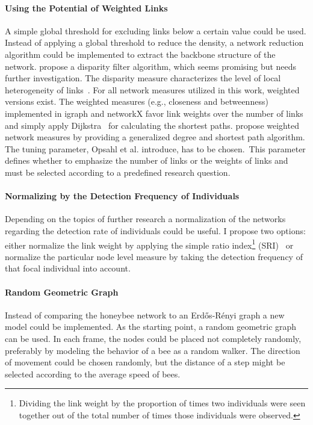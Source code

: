 \paragraph{Using the Potential of Weighted Links}
A simple global threshold for excluding links below a certain value could be used.
Instead of applying a global threshold to reduce the density, a network reduction algorithm could be implemented to extract the backbone structure of the network.
\textcite{serrano2009extracting} propose a disparity filter algorithm, which seems promising but needs further investigation.
The disparity measure characterizes the level of local heterogeneity of links~\cite{barthelemy2003spatial}.
For all network measures utilized in this work, weighted versions exist.
The weighted measures (e.g., closeness and betweenness) implemented in igraph and networkX favor link weights over the number of links and simply apply Dijkstra~\cite{dijkstra1959note} for calculating the shortest paths. \textcite{opsahl2010node} propose weighted network measures by providing a generalized degree and shortest path algorithm. The tuning parameter, Opsahl et al. introduce, has to be chosen.~This parameter defines whether to emphasize the number of links or the weights of links and must be selected according to a predefined research question.


\paragraph{Normalizing by the Detection Frequency of Individuals}
Depending on the topics of further research a normalization of the networks regarding the detection rate of individuals could be useful.
I propose two options: either normalize the link weight by applying the simple ratio index\footnote{Dividing the link weight by the proportion of times two individuals were seen together out of the total number of times those individuals were observed.} (SRI)~\cite{formica2012fitness} or normalize the particular node level measure by taking the detection frequency of that focal individual into account.

\paragraph{Random Geometric Graph}
Instead of comparing the honeybee network to an Erd\H{o}s-R\'{e}nyi graph a new model could be implemented.
As the starting point, a random geometric graph~\cite{rgg2002} can be used.
In each frame, the nodes could be placed not completely randomly, preferably by modeling the behavior of a bee as a random walker.
The direction of movement could be chosen randomly, but the distance of a step might be selected according to the average speed of bees.


